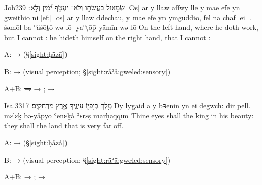 \begin{example}{Job}{23}{9}{}{}
	\quoling
	{שְׂמֹ֣אול בַּעֲשֹׂת֣וֹ וְלֹא־ יַעְטֹ֥ף יָ֝מִ֗ין וְלֹ֣א ׃}
	{[Os] ar y llaw aſſwy lle y mae efe yn gweithio ni  [ef:] [os] ar y llaw ddechau, y mae efe yn ymguddio, fel na chaf [ei] .}
	{śəmōl ba-ʿăśōṯō wə-lō- yaʿṭōp̄ yå̄mīn wə-lō }
	{On the left hand, where he doth work, but I cannot  : he hideth himself on the right hand, that I cannot  :}
\end{example}
\begin{compactdesc}
	\item[A:]  →  (§\ref{sight:ḥå̄zå̄})
	\item[B:]  →  (visual perception; §\ref{sight:rå̄ʾå̄:gweled:sensory})
	\item[A+B:]  \sout{→ } → ;  → 
\end{compactdesc}

\begin{example}{Isa.}{33}{17}{}{}
	\quoling
	{מֶ֥לֶךְ בְּיָפְי֖וֹ  עֵינֶ֑יךָ  אֶ֥רֶץ מַרְחַקִּֽים׃}
	{Dy lygaid a  y bꝛenin yn ei degwch:  dir pell.}
	{mɛlɛḵ bə-yå̄p̄yō  ʿēnɛḵå̄  ʾɛrɛṣ marḥaqqīm}
	{Thine eyes shall  the king in his beauty: they shall  the land that is very far off.}
\end{example}
\begin{compactdesc}
	\item[A:]  →  (§\ref{sight:ḥå̄zå̄})
	\item[B:]  →  (visual perception; §\ref{sight:rå̄ʾå̄:gweled:sensory})
	\item[A+B:]  → ;  → 
\end{compactdesc}
